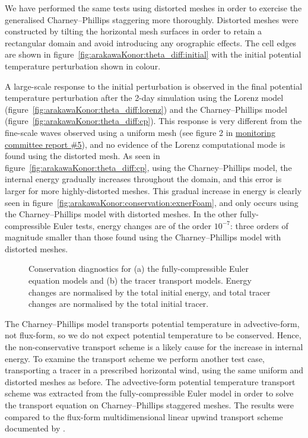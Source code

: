 \documentclass[a4paper,11pt]{article}
\begin{document}
We have performed the same tests using distorted meshes in order to exercise the generalised Charney--Phillips staggering more thoroughly.
Distorted meshes were constructed by tilting the horizontal mesh surfaces in order to retain a rectangular domain and avoid introducing any orographic effects.
The cell edges are shown in figure~\ref{fig:arakawaKonor:theta_diff:initial} with the initial potential temperature perturbation shown in colour.

A large-scale response to the initial perturbation is observed in the final potential temperature perturbation after the 2-day simulation using the Lorenz model (figure~\ref{fig:arakawaKonor:theta_diff:lorenz}) and the Charney--Phillips model (figure~\ref{fig:arakawaKonor:theta_diff:cp}).
This response is very different from the fine-scale waves observed using a uniform mesh (see figure 2 in \href{http://www.datumedge.co.uk/publications/mc-report-2017-06.pdf}{monitoring committee report \#5}), and no evidence of the Lorenz computational mode is found using the distorted mesh.
As seen in figure~\ref{fig:arakawaKonor:theta_diff:cp}, using the Charney--Phillips model, the internal energy gradually increases throughout the domain, and this error is larger for more highly-distorted meshes.
This gradual increase in energy is clearly seen in figure~\ref{fig:arakawaKonor:conservation:exnerFoam}, and only occurs using the Charney--Phillips model with distorted meshes.
In the other fully-compressible Euler tests, energy changes are of the order $10^{-7}$: three orders of magnitude smaller than those found using the Charney--Phillips model with distorted meshes.

\begin{figure}
	\centering
	\begin{subfigure}{\textwidth}
		\label{fig:arakawaKonor:conservation:exnerFoam}
		\label{fig:arakawaKonor:conservation:advection}
		
	\end{subfigure}
	\caption{Conservation diagnostics for (a) the fully-compressible Euler equation models and (b) the tracer transport models.  Energy changes are normalised by the total initial energy, and total tracer changes are normalised by the total initial tracer.}
	\label{fig:arakawaKonor:conservation}
\end{figure}

The Charney--Phillips model transports potential temperature in advective-form, not flux-form, so we do not expect potential temperature to be conserved.  Hence, the non-conservative transport scheme is a likely cause for the increase in internal energy.
To examine the transport scheme we perform another test case, transporting a tracer in a prescribed horizontal wind, using the same uniform and distorted meshes as before.  
The advective-form potential temperature transport scheme was extracted from the fully-compressible Euler model in order to solve the transport equation on Charney--Phillips staggered meshes.  The results were compared to the flux-form multidimensional linear upwind transport scheme documented by \citet{shaw2017}.
\end{document}
